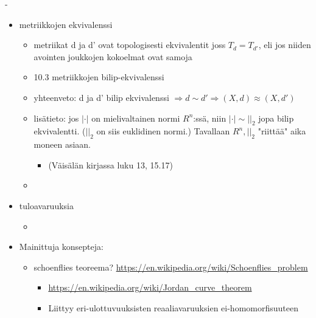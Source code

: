 \documentclass[12pt,a4paper,leqno]{amsart}
\begin{document}
- 
\begin{itemize}
    \item  metriikkojen ekvivalenssi
    \begin{itemize}
        \item metriikat d ja d' ovat topologisesti ekvivalentit joss $T_d = T_{d'}$, eli jos niiden avointen joukkojen kokoelmat ovat samoja
    \end{itemize}
    \begin{itemize}
        \item 10.3 metriikkojen bilip-ekvivalenssi
    \end{itemize}
    \begin{itemize}
        \item yhteenveto: d ja d' bilip ekvivalenssi $\Rightarrow d \sim  d' \Rightarrow (X, d) \approx (X, d')$
    \end{itemize}
    \begin{itemize}
        \item lisätieto: jos $| \cdot |$ on mielivaltainen normi $R^n$:ssä, niin $| \cdot | \sim | |_2$ jopa bilip ekvivalentti. ($|  |_2$ on siis euklidinen normi.) Tavallaan $R^n, ||_2$ "riittää" aika moneen asiaan.
        \begin{itemize}
            \item (Väisälän kirjassa luku 13, 15.17)
        \end{itemize}
    \end{itemize}
    \begin{itemize}
        \item %
    \end{itemize}
    \item tuloavaruuksia
    \begin{itemize}
        \item 
    \end{itemize}
    \item Mainittuja konsepteja:
    \begin{itemize}
        \item schoenflies teoreema? \url{https://en.wikipedia.org/wiki/Schoenflies_problem}
        \begin{itemize}
            \item \url{https://en.wikipedia.org/wiki/Jordan_curve_theorem}
        \end{itemize}
        \begin{itemize}
            \item Liittyy eri-ulottuvuuksisten reaaliavaruuksien ei-homomorfisuuteen
        \end{itemize}
    \end{itemize}
\end{itemize}
\end{document}
